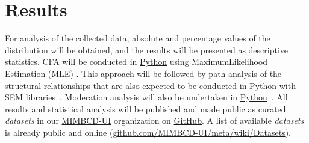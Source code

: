 
\section{Results}
\label{sec:sec011}

For analysis of the collected data, absolute and percentage values of the distribution will be obtained, and the results will be presented as descriptive statistics.
CFA will be conducted in \href{https://www.python.org/}{Python} using MaximumLikelihood Estimation (MLE) \cite{cham2017full}.
This approach will be followed by path analysis of the structural relationships that are also expected to be conducted in \href{https://www.python.org/}{Python} with SEM libraries~\cite{igolkina2020semopy}.
Moderation analysis will also be undertaken in \href{https://www.python.org/}{Python}~\cite{hayes2017regression}.
All results and statistical analysis will be published and made public as curated {\it datasets} in our \href{https://github.com/MIMBCD-UI}{MIMBCD-UI} organization on \href{https://github.com/}{GitHub}.
A list of available {\it datasets} is already public and online (\href{https://github.com/MIMBCD-UI/meta/wiki/Datasets}{github.com/MIMBCD-UI/meta/wiki/Datasets}).


